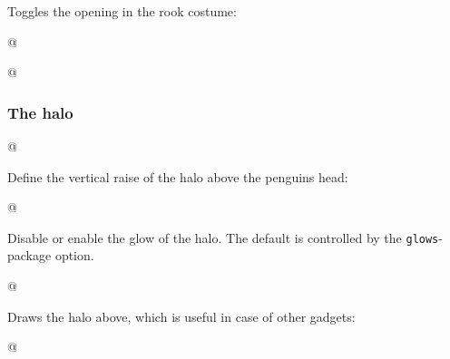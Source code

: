 \documentclass[parskip=half,english,numbers=noenddot,footnotes=nomultiple,oneside]{scrartcl}
\begin{document}
Toggles the opening in the rook costume:
\begin{tcblisting}{@}
\begin{tikzpicture}
	\pingu[rook, rook hatch=false]
\end{tikzpicture}
\end{tcblisting}
\endsubkeyexplain

{\def\pingu@color@rook{<rook-color>}
\begin{tcblisting}{@}
\begin{tikzpicture}
	\pingu[rook, rook shade=green]
\end{tikzpicture}
\end{tcblisting}
\endsubkeyexplain}

\subsubsection{The halo}
\begin{tcblisting}{@}
\begin{tikzpicture}
	\pingu[halo=green]
\end{tikzpicture}
\end{tcblisting}
\endkeyexplain

Define the vertical raise of the halo above the penguins head:
\begin{tcblisting}{@}
\begin{tikzpicture}
	\pingu[halo, halo raise=4mm]
\end{tikzpicture}
\end{tcblisting}
\endsubkeyexplain

Disable or enable the glow of the halo. The default is controlled by the \texttt{glows}-package option.
\begin{tcblisting}{@}
\begin{tikzpicture}
	\pingu[halo, halo glow=false]
\end{tikzpicture}
\end{tcblisting}
\endsubkeyexplain

Draws the halo above, which is useful in case of other gadgets:
\begin{tcblisting}{@}
\begin{tikzpicture}
	\pingu[halo, halo above=true]
\end{tikzpicture}
\end{tcblisting}
\endsubkeyexplain
\end{document}
